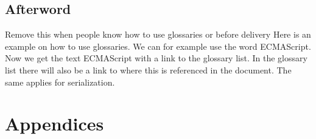 \documentclass[BSP,english,oneside]{classes/gucthesis}
\newcommand{\comment}[1]{\textcolor{blue}{\emph{#1}}}
\newcommand{\todo}[1]{{\color{green}#1}}
\begin{document}
	\chapter{Afterword}
		\label{chap:afterword}
		


\todo{Remove this when people know how to use glossaries or before delivery}
Here is an example on how to use glossaries. We can for example use the word
\gls{ECMAScript}. Now we get the text ECMAScript with a link to the glossary
list. In the glossary list there will also be a link to where this is 
referenced in the document. The same applies for \gls{serialization}.






\printnoidxglossary[sort=word]


\part{Appendices}

\appendix %

% 

% 

% 


\end{document}
